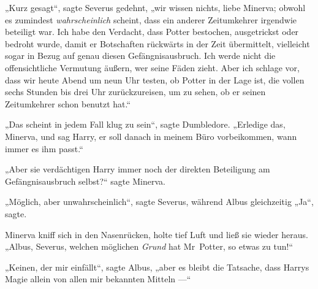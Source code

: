 „Kurz gesagt“, sagte Severus gedehnt, „wir wissen nichts, liebe Minerva; obwohl es zumindest \emph{wahrscheinlich} scheint, dass ein anderer Zeitumkehrer irgendwie beteiligt war. Ich habe den Verdacht, dass Potter bestochen, ausgetrickst oder bedroht wurde, damit er Botschaften rückwärts in der Zeit übermittelt, vielleicht sogar in Bezug auf genau diesen Gefängnisausbruch. Ich werde nicht die offensichtliche Vermutung äußern, wer seine Fäden zieht. Aber ich schlage vor, dass wir heute Abend um neun Uhr testen, ob Potter in der Lage ist, die vollen sechs Stunden bis drei Uhr zurückzureisen, um zu sehen, ob er seinen Zeitumkehrer schon benutzt hat.“

„Das scheint in jedem Fall klug zu sein“, sagte Dumbledore.
„Erledige das, Minerva, und sag Harry, er soll danach in meinem Büro vorbeikommen, wann immer es ihm passt.“

„Aber sie verdächtigen Harry immer noch der direkten Beteiligung am Gefängnisausbruch selbst?“ sagte Minerva.

„Möglich, aber unwahrscheinlich“, sagte Severus, während Albus gleichzeitig
„Ja“, sagte.

Minerva kniff sich in den Nasenrücken, holte tief Luft und ließ sie wieder heraus.
„Albus, Severus, welchen möglichen \emph{Grund} hat Mr~Potter, so etwas zu tun!“

„Keinen, der mir einfällt“, sagte Albus, „aber es bleibt die Tatsache, dass Harrys Magie allein von allen mir bekannten Mitteln —“

